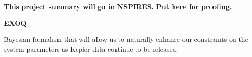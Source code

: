 {\bf This project summary will go in NSPIRES.  Put here for proofing.} \medskip 

\centerline{\bf EXOQ} \medskip 

Bayesian formalism that will allow us to naturally enhance our
constraints on the system parameters as Kepler data continue to be
released.
